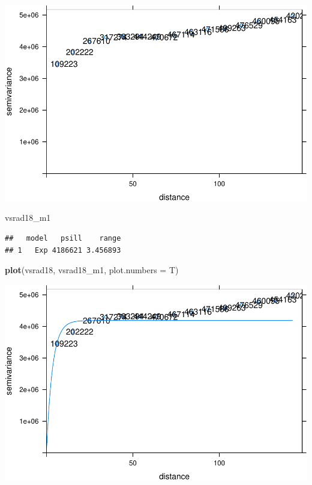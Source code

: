 \documentclass[11pt,]{article}
\newenvironment{Shaded}{\begin{snugshade}}{\end{snugshade}}
\newcommand{\KeywordTok}[1]{\textcolor[rgb]{0.13,0.29,0.53}{\textbf{#1}}}
\newcommand{\DataTypeTok}[1]{\textcolor[rgb]{0.13,0.29,0.53}{#1}}
\newcommand{\NormalTok}[1]{#1}
\begin{document}
\includegraphics{proyecto_files/figure-latex/unnamed-chunk-38-1.pdf}

\begin{Shaded}
\begin{Highlighting}[]
\NormalTok{vsrad18_m1}
\end{Highlighting}
\end{Shaded}

\begin{verbatim}
##   model   psill    range
## 1   Exp 4186621 3.456893
\end{verbatim}

\begin{Shaded}
\begin{Highlighting}[]
\KeywordTok{plot}\NormalTok{(vsrad18, vsrad18_m1, }\DataTypeTok{plot.numbers =}\NormalTok{ T)}
\end{Highlighting}
\end{Shaded}

\includegraphics{proyecto_files/figure-latex/unnamed-chunk-38-2.pdf}
\end{document}
